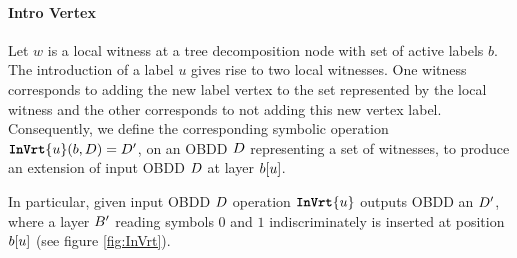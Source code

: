 \paragraph*{Intro Vertex}

Let $w$ is a local witness at a tree decomposition node with set of active labels $b$. The introduction of a label $u$ gives rise to two local witnesses. One witness corresponds to adding the new label vertex to the set represented by the local witness and the other corresponds to not adding this new vertex label. Consequently, we define the corresponding symbolic operation $\texttt{\textbf{InVrt}}\{u\}(b, D) = D'$, on an OBDD $D$ representing a set of witnesses, to produce an extension of input OBDD $D$ at layer $b[u]$.

In particular, given input OBDD $D$ operation $\texttt{\textbf{InVrt}}\{u\}$ outputs OBDD an $D'$, where a layer $B'$ reading symbols $0$ and $1$ indiscriminately is inserted at position $b[u]$ (see figure \ref{fig:InVrt}). 




